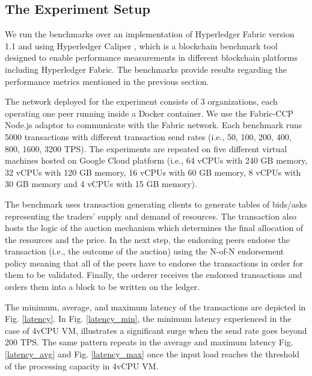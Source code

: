 \documentclass[conference]{IEEEtran}
\begin{document}
\subsection{The Experiment Setup}
We run the benchmarks over an implementation of Hyperledger Fabric version 1.1 and using Hyperledger Caliper \cite{caliper}, which is a blockchain benchmark tool designed to enable performance measurements in different blockchain platforms including Hyperledger Fabric. The benchmarks provide results regarding the performance metrics mentioned in the previous section.

The network deployed for the experiment consists of 3 organizations, each operating one peer running inside a Docker container. We use the Fabric-CCP Node.js adaptor to communicate with the Fabric network. Each benchmark runs 5000 transactions with different transaction send rates (i.e., 50, 100, 200, 400, 800, 1600, 3200 TPS). The experiments are repeated on five different virtual machines hosted on Google Cloud platform (i.e., 64 vCPUs with 240 GB memory, 32 vCPUs with 120 GB memory, 16 vCPUs with 60 GB memory, 8 vCPUs with 30 GB memory and 4 vCPUs with 15 GB memory).

The benchmark uses transaction generating clients to generate tables of bids/asks representing the traders' supply and demand of resources. The transaction also hosts the logic of the auction mechanism which determines the final allocation of the resources and the price. In the next step, the endorsing peers endorse the transaction (i.e., the outcome of the auction) using the N-of-N endorsement policy meaning that all of the peers have to endorse the transactions in order for them to be validated. Finally, the orderer receives the endorsed transactions and orders them into a block to be written on the ledger.

The minimum, average, and maximum latency of the transactions are depicted in Fig. \ref{latency}. In Fig. \ref{latency_min}, the minimum latency experienced in the case of 4vCPU VM, illustrates a significant surge when the send rate goes beyond 200 TPS. The same pattern repeats in the average and maximum latency Fig. \ref{latency_avg} and Fig. \ref{latency_max} once the input load reaches the threshold of the processing capacity in 4vCPU VM.


\end{document}
